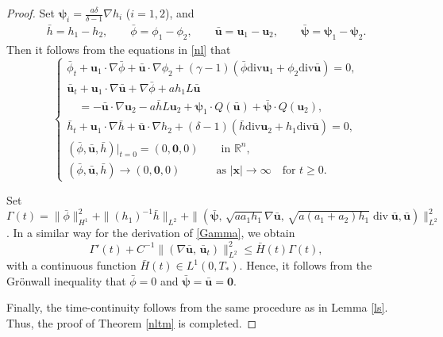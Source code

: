 \documentclass[11pt,reqno]{amsart}
\DeclareMathOperator{\diver}{\mathrm{div}}
\numberwithin{rk}{section}
\numberwithin{prop}{section}
\numberwithin{mydef}{section}
\numberwithin{lem}{section}
\numberwithin{equation}{section}
\numberwithin{thm}{section}
\begin{document}
\begin{proof}
Set 
$\boldsymbol{\psi}_i=\frac{a\delta}{\delta-1}\nabla h_i$ ($i=1,2$), and 
\begin{equation*}
\begin{aligned}
\bar{h}=h_1-h_2,\qquad \bar{\phi}= \phi_1-\phi_2,\qquad \bar{\boldsymbol{u}}=\boldsymbol{u}_1-\boldsymbol{u}_2, \qquad  \bar{\boldsymbol{\psi}}=\boldsymbol{\psi}_1-\boldsymbol{\psi}_2.
\end{aligned}
\end{equation*}
Then it follows from the equations in  \eqref{nl} that
\begin{equation}\label{eq:1.2wcvb}
\begin{cases}
\displaystyle
\bar{\phi}_t+\boldsymbol{u}_1\cdot \nabla\bar{\phi}+\bar{\boldsymbol{u}} \cdot\nabla\phi_2+(\gamma-1)(\bar{\phi}\mathrm{div}\boldsymbol{u}_1 +\phi_2\mathrm{div}\bar{\boldsymbol{u}})=0,\\[3pt]
 \displaystyle
\bar{\boldsymbol{u}}_t+ \boldsymbol{u}_1\cdot\nabla \bar{\boldsymbol{u}}+\nabla \bar{\phi}+ a h_1L\bar{\boldsymbol{u}} \\[3pt]
\displaystyle
\quad =- \bar{\boldsymbol{u}} \cdot \nabla \boldsymbol{u}_2- a \bar h L\boldsymbol{u}_2+ \boldsymbol{\psi}_1 \cdot Q( \bar{\boldsymbol{u}})+\bar{\boldsymbol{\psi}} \cdot Q(\boldsymbol{u}_2),\\[3pt]
\bar{h}_t+\boldsymbol{u}_1\cdot \nabla\bar{h}+\bar{\boldsymbol{u}}\cdot\nabla h_2+(\delta-1)(\bar{h} \mathrm{div}\boldsymbol{u}_2 +h_1\mathrm{div}\bar{\boldsymbol{u}})=0,\\[3pt]
\displaystyle
(\bar{\phi},\bar{\boldsymbol{u}},\bar{h})|_{t=0}=(0,\boldsymbol{0},0) \qquad \text{in $\mathbb{R}^n$},\\[3pt]
\displaystyle
(\bar{\phi},\bar{\boldsymbol{u}},\bar{h})\to (0,\boldsymbol{0},0) \qquad\quad \ \text{as $|\boldsymbol{x}|\to \infty$} \quad \text{for $t\geq 0$}.
\end{cases}
\end{equation}

Set 
$\varGamma(t)=\|\bar\phi\|_{H^1}^2
+\|(h_1)^{-1}\bar{h}\|_{L^2}+\|(\bar{\boldsymbol{\psi}},\, \sqrt{aa_1h_1}\nabla\bar{\boldsymbol{u}},\,\sqrt{a(a_1+a_2)h_1}\diver\bar{\boldsymbol{u}},\bar{\boldsymbol{u}})\|^2_{L^2}$. 
In a similar way for  the derivation of \eqref{Gamma}, we obtain
\begin{equation*}
\varGamma'(t)+C^{-1}\|(\nabla \bar{\boldsymbol{u}},\,\bar{\boldsymbol{u}}_t)\|^2_{L^2}
\leq \bar{H}(t)\varGamma(t),
\end{equation*}
with a continuous  function $\bar{H}(t)\in L^1(0,T_*)$. Hence, it follows from the Gr\"onwall inequality that
$\bar{\phi}=0$ and $\bar{\boldsymbol{\psi}}=\bar{\boldsymbol{u}}=\boldsymbol{0}$.



Finally, the time-continuity follows from the same procedure as in Lemma \ref{ls}. Thus, the proof of Theorem \ref{nltm} is completed.
\end{proof}
\end{document}

